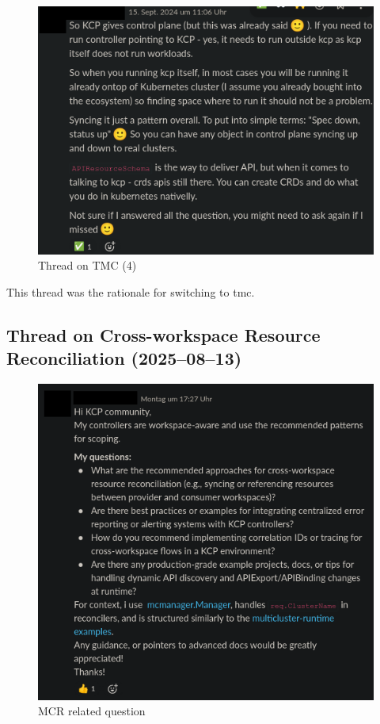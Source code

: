 \documentclass[11pt, a4paper, oneside, listof=totoc]{scrartcl}
\begin{document}
                \begin{figure}[h!]
                    \centering
                    \includegraphics[width=\textwidth]{screenshots/slack/tmc4.anonymized.png}
                    \caption{Thread on TMC (4)}\label{fig:tmc4}
                \end{figure}

                This thread was the rationale for switching to \gls{tmc}.

            \FloatBarrier
            \subsection{Thread on Cross-workspace Resource Reconciliation (2025--08--13)}
                \begin{figure}[h!]
                    \centering
                    \includegraphics[width=\textwidth]{screenshots/slack/mcr-question.anonymized.png}
                    \caption{MCR related question}\label{fig:mcr-question}
                \end{figure}
\end{document}
